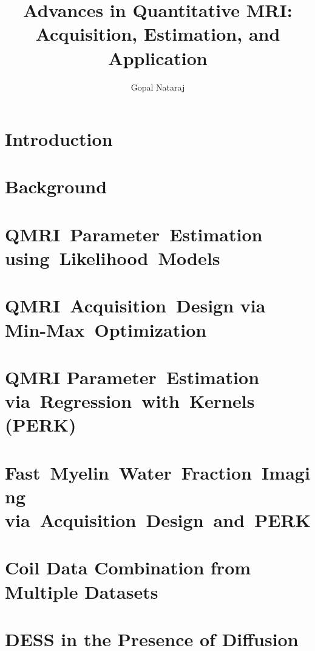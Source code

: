 \documentclass[draft]{../cls/thesis-umich}
\title{
	Advances in Quantitative MRI: \\
	Acquisition,
	Estimation,
	and 
	Application
}
\author{Gopal Nataraj}
\begin{document}
\chapter{Introduction}
\label{c,intro}


\chapter{Background}
\label{c,bkgrd}


\chapter{QMRI~Parameter~Estimation using~Likelihood~Models}
\label{c,relax}


\chapter{QMRI~Acquisition~Design via Min-Max~Optimization}
\label{c,scn-dsgn}


\chapter{QMRI Parameter~Estimation via~Regression~with~Kernels (PERK)}
\label{c,perk}


\chapter{Fast~Myelin~Water~Fraction~Imaging via~Acquisition~Design~and~PERK}
\label{c,mwf}


% 

\appendix
\chapter{Coil Data Combination from Multiple Datasets}
\label{a,cc-multi}


\chapter{DESS in the Presence of Diffusion}
\label{a,dess-diff}




\end{document}
